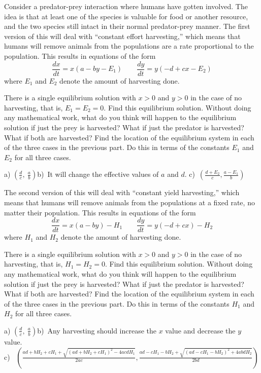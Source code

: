 \begin{exercise}
Consider a predator-prey interaction where humans have gotten involved. The idea is that at least one of the species is valuable for food or another resource, and the two species still intact in their normal predator-prey manner. The first version of this will deal with ``constant effort harvesting,'' which means that humans will remove animals from the populations are a rate proportional to the population. This results in equations of the form
\[ \frac{dx}{dt} = x(a - by - E_1) \qquad \frac{dy}{dt} = y(-d + cx - E_2) \] where $E_1$ and $E_2$ denote the amount of harvesting done.
\begin{tasks}
\task There is a single equilibrium solution with $x > 0$ and $y>0$ in the case of no harvesting, that is, $E_1 = E_2 = 0$. Find this equilibrium solution.
\task Without doing any mathematical work, what do you think will happen to the equilibrium solution if just the prey is harvested? What if just the predator is harvested? What if both are harvested?
\task Find the location of the equilibrium system in each of the three cases in the previous part. Do this in terms of the constants $E_1$ and $E_2$ for all three cases. 
\end{tasks}
\end{exercise}
\comboSol{%
}
{%
a) $(\frac{d}{c},\ \frac{a}{b})$\quad b)~It will change the effective values of $a$ and $d$. \quad c)~$\left(\frac{d+E_2}{c}, \frac{a-E_1}{b}\right)$
}

\begin{exercise}
The second version of this will deal with ``constant yield harvesting,'' which means that humans will remove animals from the populations at a fixed rate, no matter their population. This results in equations of the form
\[ \frac{dx}{dt} = x(a - by) - H_1 \qquad \frac{dy}{dt} = y(-d + cx) - H_2 \] where $H_1$ and $H_2$ denote the amount of harvesting done.
\begin{tasks}
\task There is a single equilibrium solution with $x > 0$ and $y>0$ in the case of no harvesting, that is, $H_1 = H_2 = 0$. Find this equilibrium solution.
\task Without doing any mathematical work, what do you think will happen to the equilibrium solution if just the prey is harvested? What if just the predator is harvested? What if both are harvested?
\task Find the location of the equilibrium system in each of the three cases in the previous part. Do this in terms of the constants $H_1$ and $H_2$ for all three cases. 
\end{tasks}
\end{exercise}
\comboSol{%
}
{%
a) $(\frac{d}{c},\ \frac{a}{b})$\quad b)~Any harvesting should increase the $x$ value and decrease the $y$ value. \\
c)~ $\left( \frac{ad+bH_2 + cH_1 + \sqrt{(ad+bH_2 + cH_1)^2 - 4acdH_1}}{2ac}, \frac{ad-cH_1 - bH_2 + \sqrt{(ad-cH_1 - bH_2)^2 +4abdH_2}}{2bd}\right)$
}

